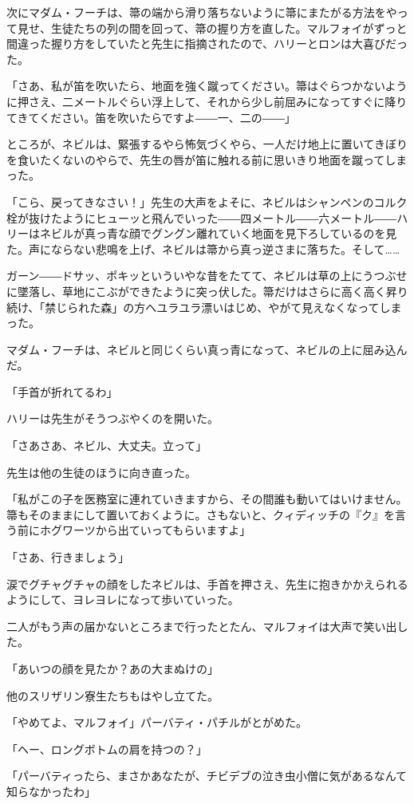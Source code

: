 \documentclass[10pt,a4paper]{article}
\begin{document}
\begin{CJK}{UTF8}{min}
次にマダム・フーチは、箒の端から滑り落ちないように箒にまたがる方法をやって見せ、生徒たちの列の間を回って、箒の握り方を直した。マルフォイがずっと間違った握り方をしていたと先生に指摘されたので、ハリーとロンは大喜びだった。

「さあ、私が笛を吹いたら、地面を強く蹴ってください。箒はぐらつかないように押さえ、二メートルぐらい浮上して、それから少し前屈みになってすぐに降りてきてください。笛を吹いたらですよ――一、二の――」

ところが、ネビルは、緊張するやら怖気づくやら、一人だけ地上に置いてきぼりを食いたくないのやらで、先生の唇が笛に触れる前に思いきり地面を蹴ってしまった。

「こら、戻ってきなさい！」先生の大声をよそに、ネビルはシャンペンのコルク栓が抜けたようにヒューッと飛んでいった――四メートル――六メートル――ハリーはネビルが真っ青な顔でグングン離れていく地面を見下ろしているのを見た。声にならない悲鳴を上げ、ネビルは箒から真っ逆さまに落ちた。そして……

ガーン――ドサッ、ポキッといういやな昔をたてて、ネビルは草の上にうつぶせに墜落し、草地にこぶができたように突っ伏した。箒だけはさらに高く高く昇り続け、「禁じられた森」の方へユラユラ漂いはじめ、やがて見えなくなってしまった。

マダム・フーチは、ネビルと同じくらい真っ青になって、ネビルの上に屈み込んだ。

「手首が折れてるわ」

ハリーは先生がそうつぶやくのを開いた。

「さあさあ、ネビル、大丈夫。立って」

先生は他の生徒のほうに向き直った。

「私がこの子を医務室に連れていきますから、その間誰も動いてはいけません。箒もそのままにして置いておくように。さもないと、クィディッチの『ク』を言う前にホグワーツから出ていってもらいますよ」

「さあ、行きましょう」

涙でグチャグチャの顔をしたネビルは、手首を押さえ、先生に抱きかかえられるようにして、ヨレヨレになって歩いていった。

二人がもう声の届かないところまで行ったとたん、マルフォイは大声で笑い出した。

「あいつの顔を見たか？あの大まぬけの」

他のスリザリン寮生たちもはやし立てた。

「やめてよ、マルフォイ」パーバティ・パチルがとがめた。

「ヘー、ロングボトムの肩を持つの？」

「パーバティったら、まさかあなたが、チビデブの泣き虫小僧に気があるなんて知らなかったわ」


\end{CJK}
\end{document}
